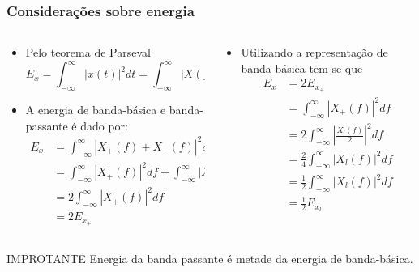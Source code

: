\documentclass[10pt,hyperref={pdfpagemode=FullScreen},aspectratio=169]{beamer}
\begin{document}
\begin{frame}
  \frametitle{Considerações sobre energia}

  \begin{columns}[T]
    \begin{column}{0.5\textwidth}
      \begin{itemize}
        \item Pelo teorema de Parseval 
        $$
      E_x = \int _{-\infty}^{\infty} |x(t)|^2 dt  =  \int _{-\infty}^{\infty} |X(f)|^2 df  
      $$
      \item A energia de banda-básica e banda-passante é dado por:
      \begin{align*}
        E_x &= \int _{-\infty}^{\infty}  | X_+(f) + X_-(f)|^2 df \\ 
            &=  \int _{-\infty}^{\infty}  | X_+(f)|^2 df + \int _{-\infty}^{\infty}  | X_-(f)|^2 df \\
            &= 2\int _{-\infty}^{\infty}  | X_+(f)|^2 df \\
            &= 2 E_{x_+}
        \end{align*}
      \end{itemize}
      
    \end{column}
    \begin{column}{0.5\textwidth}
    \begin{itemize}
      \item  Utilizando a representação de banda-básica tem-se que 
       \begin{align*}
       E_x &= 2 E_{x_+}  \\
          &= \int _{-\infty}^{\infty}  | X_+(f)|^2 df \\
          &= 2 \int _{-\infty}^{\infty}  | \frac{X_l(f)}{2}|^2 df \\
          &= \frac{2}{4} \int _{-\infty}^{\infty}  | X_l(f)|^2 df \\
          &= \frac{1}{2}\int _{-\infty}^{\infty}  | X_l(f)|^2 df  \\
          &= \frac{1}{2} E_{x_l}
       \end{align*}
      
    \end{itemize}

    \end{column}
    \end{columns}
    {
      \begin{block}{IMPROTANTE}
        Energia da banda passante é metade da energia de banda-básica.
      \end{block}}
\end{frame}
\end{document}
